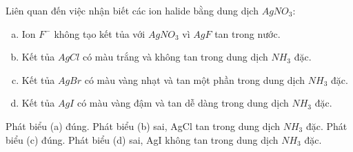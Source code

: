 \documentclass[Main.tex]{subfiles}
\begin{document}
    \begin{ex}
        Liên quan đến việc nhận biết các ion halide bằng dung dịch $AgNO_3$:
        \begin{enumerate}[(a)]
            \item Ion $F^-$ không tạo kết tủa với $AgNO_3$ vì $AgF$ tan trong nước.
            \item Kết tủa $AgCl$ có màu trắng và không tan trong dung dịch $NH_3$ đặc.
            \item Kết tủa $AgBr$ có màu vàng nhạt và tan một phần trong dung dịch $NH_3$ đặc.
            \item Kết tủa $AgI$ có màu vàng đậm và tan dễ dàng trong dung dịch $NH_3$ đặc.
        \end{enumerate}
        \choiceTF
        {\True Phát biểu (a) đúng.}
        {Phát biểu (b) sai, AgCl tan trong dung dịch $NH_3$ đặc.}
        {\True Phát biểu (c) đúng.}
        {Phát biểu (d) sai, AgI không tan trong dung dịch $NH_3$ đặc.}
    \end{ex}
    
\end{document}
